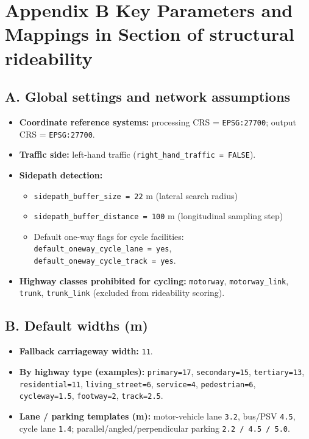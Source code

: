 \documentclass[
  12pt,
  oneside]{book}
\providecommand{\tightlist}{%
  \setlength{\itemsep}{0pt}\setlength{\parskip}{0pt}}
\begin{document}
\clearpage

\section*{Appendix B Key Parameters and Mappings in Section of structural rideability}\label{sec:appendix-params}

\subsection*{A. Global settings and network assumptions}\label{a.-global-settings-and-network-assumptions}

\begin{itemize}
\tightlist
\item
  \textbf{Coordinate reference systems:} processing CRS = \texttt{EPSG:27700}; output CRS = \texttt{EPSG:27700}.
\item
  \textbf{Traffic side:} left-hand traffic (\texttt{right\_hand\_traffic\ =\ FALSE}).
\item
  \textbf{Sidepath detection:}

  \begin{itemize}
  \tightlist
  \item
    \texttt{sidepath\_buffer\_size\ =\ 22} m (lateral search radius)
  \item
    \texttt{sidepath\_buffer\_distance\ =\ 100} m (longitudinal sampling step)
  \item
    Default one-way flags for cycle facilities: \texttt{default\_oneway\_cycle\_lane\ =\ \textquotesingle{}yes\textquotesingle{}}, \texttt{default\_oneway\_cycle\_track\ =\ \textquotesingle{}yes\textquotesingle{}}.
  \end{itemize}
\item
  \textbf{Highway classes prohibited for cycling:} \texttt{motorway}, \texttt{motorway\_link}, \texttt{trunk}, \texttt{trunk\_link} (excluded from rideability scoring).
\end{itemize}

\subsection*{B. Default widths (m)}\label{b.-default-widths-m}

\begin{itemize}
\tightlist
\item
  \textbf{Fallback carriageway width:} \texttt{11}.
\item
  \textbf{By highway type (examples):} \texttt{primary=17}, \texttt{secondary=15}, \texttt{tertiary=13}, \texttt{residential=11}, \texttt{living\_street=6}, \texttt{service=4}, \texttt{pedestrian=6}, \texttt{cycleway=1.5}, \texttt{footway=2}, \texttt{track=2.5}.
\item
  \textbf{Lane / parking templates (m):} motor-vehicle lane \texttt{3.2}, bus/PSV \texttt{4.5}, cycle lane \texttt{1.4}; parallel/angled/perpendicular parking \texttt{2.2\ /\ 4.5\ /\ 5.0}.
\end{itemize}
\end{document}
